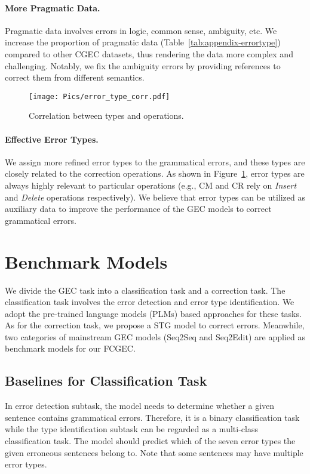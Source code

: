 \documentclass[11pt]{article}
\begin{document}
\paragraph{More Pragmatic Data.}

Pragmatic data involves errors in logic, common sense, ambiguity, etc. We increase the proportion of pragmatic data (Table~\ref{tab:appendix-errortype}) compared to other CGEC datasets, thus rendering the data more complex and challenging. Notably, we fix the ambiguity errors by providing references to correct them from different semantics. 

\begin{figure}[t]
	\centering
	\texttt{[image: Pics/error\_type\_corr.pdf]} 
	\caption{Correlation between types and operations.}
	\label{fig:type-corr}
\end{figure}
 
\paragraph{Effective Error Types.}
We assign more refined error types to the grammatical errors, and these types are closely related to the correction operations. As shown in Figure~\ref{fig:type-corr}, error types are always highly relevant to particular operations (e.g., CM and CR rely on \emph{Insert} and \emph{Delete} operations respectively). We believe that error types can be utilized as auxiliary data to improve the performance of the GEC models to correct grammatical errors. 
\section{Benchmark Models}

We divide the GEC task into a classification task and a correction task. The classification task involves the error detection and error type identification. We adopt the pre-trained language models (PLMs) based approaches for these tasks. As for the correction task, we propose a STG model to correct errors. Meanwhile, two categories of mainstream GEC models (Seq2Seq and Seq2Edit) are applied as benchmark models for our FCGEC.

\subsection{Baselines for Classification Task}

In error detection subtask, the model needs to determine whether a given sentence contains grammatical errors. Therefore, it is a binary classification task while the type identification subtask can be regarded as a multi-class classification task. The model should predict which of the seven error types the given erroneous sentences belong to. Note that some sentences may have multiple error types.
\end{document}
